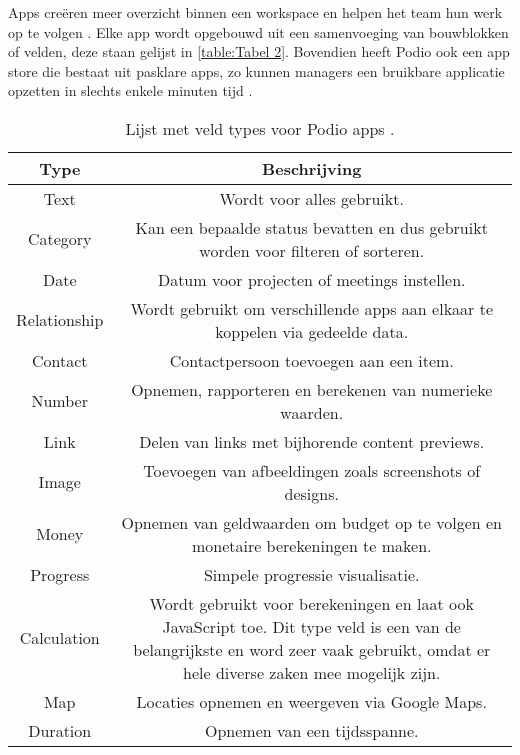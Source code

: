 Apps creëren meer overzicht binnen een workspace en helpen het team hun werk op te volgen \autocite{PodioFeatures}. Elke app wordt opgebouwd uit een samenvoeging van bouwblokken of velden, deze staan gelijst in \ref{table:Tabel 2}. Bovendien heeft Podio ook een app store die bestaat uit pasklare apps, zo kunnen managers een bruikbare applicatie opzetten in slechts enkele minuten tijd \autocite{TallyfyPodio}. 

\begin{table}[ht]
    \centering
    \caption{\label{tab:Tabel 1} Lijst met veld types voor Podio apps \autocite{https://podio.com/site/features-index}.}
    \begin{tabular}{ | c | c | }
        \hline
        \textbf{Type} & \textbf{Beschrijving} \\
        \hline\hline
        Text & Wordt voor alles gebruikt. \\
        Category & Kan een bepaalde status bevatten en dus gebruikt worden voor filteren of sorteren. \\
        Date & Datum voor projecten of meetings instellen. \\
        Relationship & Wordt gebruikt om verschillende apps aan elkaar te koppelen via gedeelde data. \\
        Contact & Contactpersoon toevoegen aan een item. \\
        Number & Opnemen, rapporteren en berekenen van numerieke waarden. \\
        Link & Delen van links met bijhorende content previews. \\
        Image & Toevoegen van afbeeldingen zoals screenshots of designs. \\
        Money & Opnemen van geldwaarden om budget op te volgen en monetaire berekeningen te maken. \\
        Progress & Simpele progressie visualisatie. \\
        Calculation & Wordt gebruikt voor berekeningen en laat ook JavaScript toe. Dit type veld is een van de belangrijkste en word zeer vaak gebruikt, omdat er hele diverse zaken mee mogelijk zijn. \\
        Map & Locaties opnemen en weergeven via Google Maps. \\
        Duration & Opnemen van een tijdsspanne. \\
        \hline
\end{tabular}
\end{table}
    
